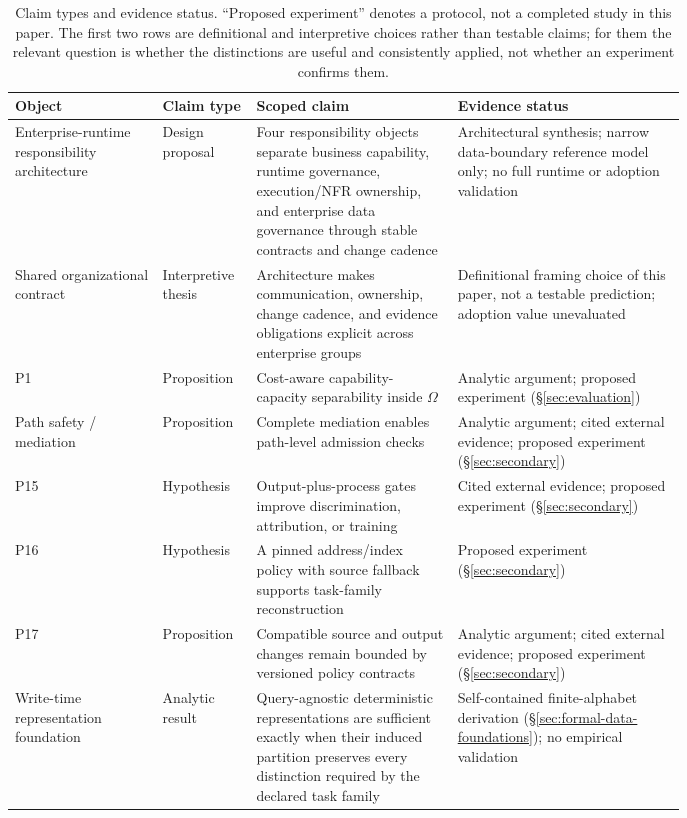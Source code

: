 \documentclass[11pt]{article}
\begin{document}
\begin{table}[t]
\centering
\caption{Claim types and evidence status. ``Proposed experiment'' denotes a protocol, not a completed study in this paper. The first two rows are definitional and interpretive choices rather than testable claims; for them the relevant question is whether the distinctions are useful and consistently applied, not whether an experiment confirms them.}
\label{tab:propositions}
\begin{tabular}{lp{0.14\linewidth}p{0.30\linewidth}p{0.34\linewidth}}
\hline
Object & Claim type & Scoped claim & Evidence status \\
\hline
Enterprise-runtime responsibility architecture & Design proposal & Four responsibility objects separate business capability, runtime governance, execution/NFR ownership, and enterprise data governance through stable contracts and change cadence & Architectural synthesis; narrow data-boundary reference model only; no full runtime or adoption validation \\
Shared organizational contract & Interpretive thesis & Architecture makes communication, ownership, change cadence, and evidence obligations explicit across enterprise groups & Definitional framing choice of this paper, not a testable prediction; adoption value unevaluated \\
P1 & Proposition & Cost-aware capability-capacity separability inside $\Omega$ & Analytic argument; proposed experiment (\S\ref{sec:evaluation}) \\
Path safety / mediation & Proposition & Complete mediation enables path-level admission checks & Analytic argument; cited external evidence; proposed experiment (\S\ref{sec:secondary}) \\
P15 & Hypothesis & Output-plus-process gates improve discrimination, attribution, or training & Cited external evidence; proposed experiment (\S\ref{sec:secondary}) \\
P16 & Hypothesis & A pinned address/index policy with source fallback supports task-family reconstruction & Proposed experiment (\S\ref{sec:secondary}) \\
P17 & Proposition & Compatible source and output changes remain bounded by versioned policy contracts & Analytic argument; cited external evidence; proposed experiment (\S\ref{sec:secondary}) \\
Write-time representation foundation & Analytic result & Query-agnostic deterministic representations are sufficient exactly when their induced partition preserves every distinction required by the declared task family & Self-contained finite-alphabet derivation (\S\ref{sec:formal-data-foundations}); no empirical validation \\

\end{tabular}
\end{table}
\end{document}
